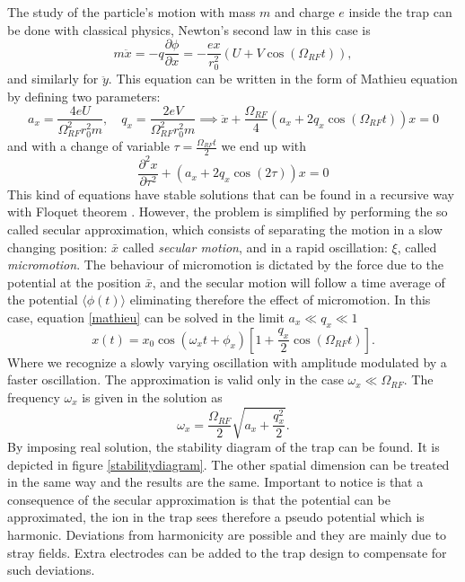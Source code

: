 The study of the particle's motion with mass $m$ and charge $e$ inside the trap can be done with classical physics, Newton's second law in this case is
\begin{equation}
m\ddot{x} = -q \frac{\partial \phi}{\partial x} = - \frac{ex}{r_0^2}\left(U + V \cos(\Omega_{RF} t) \right),
\end{equation}
and similarly for $\ddot{y}$. This equation can be written in the form of Mathieu equation by defining two parameters:
\begin{equation}
a_x = \frac{4eU}{\Omega_{RF}^2r_0^2m}, \quad q_x = \frac{2eV}{\Omega_{RF}^2r_0^2m} \implies \ddot{x} +\frac{\Omega_{RF}}{4} \left(a_x + 2q_x \cos(\Omega_{RF} t )\right)x = 0
\end{equation}
and with a change of variable $\tau = \frac{\Omega_{RF} t}{2}$ we end up with
\begin{equation}
\label{mathieu}
\frac{\partial^2 x}{\partial \tau^2}+\left(a_x + 2q_x \cos(2\tau)\right)x = 0
\end{equation}
This kind of equations have stable solutions that can be found in a recursive way with Floquet theorem \cite{iondynamic}. However, the problem is simplified by performing the so called secular approximation, which consists of separating the motion in a slow changing position: $\bar{x}$ called \emph{secular motion}, and in a rapid oscillation: $\xi$, called \emph{micromotion}. The behaviour of micromotion is dictated by the force due to the potential at the position $\bar{x}$, and the secular motion will follow a time average of the potential $\langle \phi(t) \rangle$ eliminating therefore the effect of micromotion. In this case, equation \eqref{mathieu} can be solved in the limit $a_x \ll q_x \ll 1$
\begin{equation}
x(t) = x_0 \cos(\omega_x t +\phi_x)\left[1 + \frac{q_x}{2}\cos(\Omega_{RF} t) \right].
\end{equation}
Where we recognize a slowly varying oscillation with amplitude modulated by a faster oscillation. The approximation is valid only in the case $\omega_x \ll \Omega_{RF}$. The frequency $\omega_x$ is given in the solution as
\begin{equation}
\omega_x = \frac{\Omega_{RF}}{2}\sqrt{a_x + \frac{q_x^2}{2}}.
\end{equation}
By imposing real solution, the stability diagram of the trap can be found. It is depicted in figure \ref{stabilitydiagram}. The other spatial dimension can be treated in the same way and the results are the same. Important to notice is that a consequence of the secular approximation is that the potential can be approximated, the ion in the trap sees therefore a pseudo potential which is harmonic. Deviations from harmonicity are possible and they are mainly due to stray fields. Extra electrodes can be added to the trap design to compensate for such deviations.


